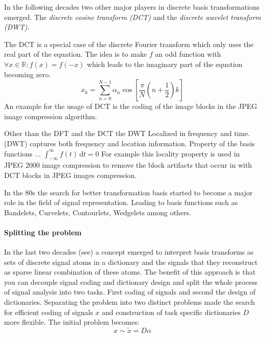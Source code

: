 In the following decades two other major players in discrete basis
transformations emerged. The \emph{discrete cosine transform (DCT)} and the
\emph{discrete wavelet transform (DWT)}. 

The DCT is a special case of the discrete Fourier transform which only uses the
real part of the equation. The idea is to make $f$ an odd function with $\forall
x \in \mathbb{R} : f(x) = f(-x)$ which leads to the imaginary part of the
equation becoming zero.
\begin{equation*}
x_k = \sum_{n=0}^{N-1}\alpha_n\cos \left[ \frac{\pi}{N} \left(
n+\frac{1}{2}\right) k\right]
\end{equation*}
An example for the usage of DCT is the coding of the image blocks in the
JPEG image compression algorithm.

Other than the DFT and the DCT the DWT
Localized in frequency and time. 
(DWT) captures both frequency and location information. 
 Property of the basis functions ...
$\int_{-\infty}^{\infty} \! f(t) \, \mathrm{d}t = 0$
For example this locality property is used in JPEG 2000 image compression to
remove the block artifacts that occur in with DCT blocks in JPEG images
compression. 

In the 80s the search for better transformation basis started to become a major
role in the field of signal representation. Leading to basis functions such as
Bandelets, Curvelets, Contourlets, Wedgelets among others.

\paragraph{Splitting the problem}
\cite{Rubinstein2010}
In the last two decades (see\cite{Olshausen1996,Mallat1993}) a concept emerged
to interpret basis transforms as sets of discrete signal atoms in a dictionary
and the signals that they reconstruct as sparse linear combination of these
atoms. The benefit of this approach is that you can decouple signal coding and
dictionary design and split the whole process of signal analysis into two tasks.
First coding of signals and second the design of dictionaries. Separating the
problem into two distinct problems made the search for efficient coding of
signals $x$ and construction of task specific dictionaries $D$ more
flexible. The initial problem becomes:
\begin{equation}
 x \sim \tilde{x}  = D\alpha
\end{equation}

